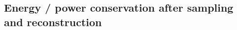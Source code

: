 %
%


\subsection{Energy / power conservation after sampling and reconstruction}
\label{sec:energyConservationThroughSampling}



